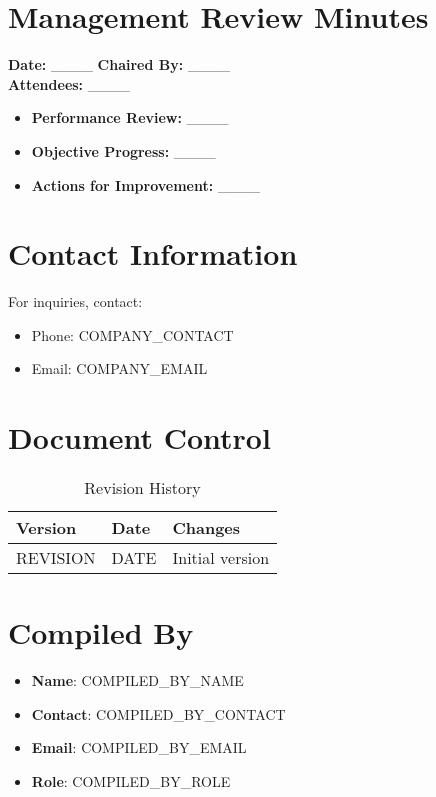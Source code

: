 \documentclass[12pt]{article}
\begin{document}
\section{Management Review Minutes}

\textbf{Date:} \_\_\_\_ \textbf{Chaired By:} \_\_\_\_\\
\textbf{Attendees:} \_\_\_\_

\begin{itemize}
    \item \textbf{Performance Review:} \_\_\_\_
    \item \textbf{Objective Progress:} \_\_\_\_
    \item \textbf{Actions for Improvement:} \_\_\_\_
\end{itemize}

\section{Contact Information}
For inquiries, contact:
\begin{itemize}
    \item Phone: {{COMPANY_CONTACT}}
    \item Email: {{COMPANY_EMAIL}}
\end{itemize}

\section{Document Control}
\begin{table}[h]
    \centering
    \begin{tabular}{p{3cm}p{3cm}p{6cm}}
        \toprule
        \textbf{Version} & \textbf{Date} & \textbf{Changes} \\
        \midrule
        {{REVISION}} & {{DATE}} & Initial version \\
        \bottomrule
    \end{tabular}
    \caption{Revision History}
\end{table}

\section{Compiled By}
\begin{itemize}
    \item \textbf{Name}: {{COMPILED_BY_NAME}}
    \item \textbf{Contact}: {{COMPILED_BY_CONTACT}}
    \item \textbf{Email}: {{COMPILED_BY_EMAIL}}
    \item \textbf{Role}: {{COMPILED_BY_ROLE}}
\end{itemize}
\end{document}
